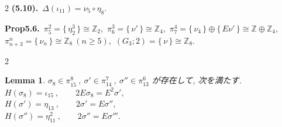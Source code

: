 \documentclass[10pt, leqno]{ltjsarticle}
\newcommand{\gen}[1]{\{\,#1\,\}}       %
\numberwithin{equation}{section}
\theoremstyle{plain}
\newtheorem{lemma}[theorem]{Lemma}
\theoremstyle{definition}
\theoremstyle{remark}
\begin{document}
\begin{paracol}{2}
\noindent
\textbf{(5.10).}\
\(\Delta(\iota_{11})=\nu_5\circ\eta_8 .\)

\noindent
\textbf{Prop5.6.}\
\(\pi^{2}_{5}=\gen{\eta_{2}^{3}}\cong \mathbb Z_{2},\) \quad
\(\pi^{3}_{6}=\gen{\nu'}\cong \mathbb Z_{4},\) \quad
\(\pi^{4}_{7}=\gen{\nu_{4}}\oplus \gen{E\nu'}\cong \mathbb Z\oplus\mathbb Z_{4},\) \\
\(\pi^{n}_{n+3}=\gen{\nu_{n}}\cong \mathbb Z_{8}\ (n\ge5),\)\quad
\((G_{3};2)=\gen{\nu}\cong \mathbb Z_{8}.\)




\end{paracol}

\begin{paracol}{2}

\begin{lemma}\label{lemma:5.14}
\(\sigma_{8}\in\pi^{8}_{15}\ , \ \sigma'\in\pi^{7}_{14}\ , \ \sigma''\in\pi^{6}_{13}\) 
が存在して, 次を満たす. \\
\(H(\sigma_{8})=\iota_{15} \ ,\qquad 2E\sigma_{8}=E^{2}\sigma',\)\\
\(H(\sigma')=\eta_{13} \ ,\qquad 2\sigma'=E\sigma'',\)\\
\(H(\sigma'')=\eta_{11}^2 \ ,\qquad 2\sigma''=E\sigma''' .\)
\end{lemma}


\end{paracol}
\end{document}
